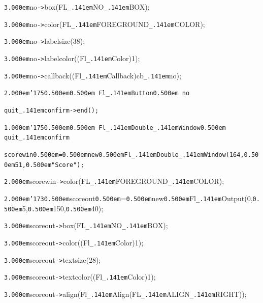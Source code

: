 \documentclass[12pt]{article}
\begin{document}
\noindent
{}{\tt\mc \kern3.000em}no{\tt -}{\tt >}box(FL{\tt\_\kern.141em}NO{\tt\_\kern.141em}BOX);

\noindent
{}{\tt\mc \kern3.000em}no{\tt -}{\tt >}color(FL{\tt\_\kern.141em}FOREGROUND{\tt\_\kern.141em}COLOR);

\noindent
{}{\tt\mc \kern3.000em}no{\tt -}{\tt >}labelsize(38);

\noindent
{}{\tt\mc \kern3.000em}no{\tt -}{\tt >}labelcolor((Fl{\tt\_\kern.141em}Color)1);

\noindent
{}{\tt\mc \kern3.000em}no{\tt -}{\tt >}callback((Fl{\tt\_\kern.141em}Callback{\tt *})cb{\tt\_\kern.141em}no);

\noindent
{}{\tt\mc \kern2.000em}{\tt\char'175}{\tt\mc \kern0.500em}\tt\mc {\tt /}{\tt /}\kern0.500em Fl{\tt\_\kern.141em}Button{\tt *}\kern0.500em no

\noindent
\tt\mc {\tt\mc \kern2.000em}quit{\tt\_\kern.141em}confirm{\tt -}{\tt >}end();

\noindent
{}{\tt\mc \kern1.000em}{\tt\char'175}{\tt\mc \kern0.500em}\tt\mc {\tt /}{\tt /}\kern0.500em Fl{\tt\_\kern.141em}Double{\tt\_\kern.141em}Window{\tt *}\kern0.500em quit{\tt\_\kern.141em}confirm

\noindent
\tt{}scorewin{\tt\mc \kern0.500em}={\tt\mc \kern0.500em}new{\tt\mc \kern0.500em}Fl{\tt\_\kern.141em}Double{\tt\_\kern.141em}Window(164,{\tt\mc \kern0.500em}51,{\tt\mc \kern0.500em}{\tt "}Score{\tt "});

\noindent
{}{\tt\mc \kern2.000em}scorewin{\tt -}{\tt >}color(FL{\tt\_\kern.141em}FOREGROUND{\tt\_\kern.141em}COLOR);

\noindent
{}{\tt\mc \kern2.000em}{\tt\char'173}{\tt\mc \kern0.500em}scoreout{\tt\mc \kern0.500em}={\tt\mc \kern0.500em}new{\tt\mc \kern0.500em}Fl{\tt\_\kern.141em}Output(0,{\tt\mc \kern0.500em}5,{\tt\mc \kern0.500em}150,{\tt\mc \kern0.500em}40);

\noindent
{}{\tt\mc \kern3.000em}scoreout{\tt -}{\tt >}box(FL{\tt\_\kern.141em}NO{\tt\_\kern.141em}BOX);

\noindent
{}{\tt\mc \kern3.000em}scoreout{\tt -}{\tt >}color((Fl{\tt\_\kern.141em}Color)1);

\noindent
{}{\tt\mc \kern3.000em}scoreout{\tt -}{\tt >}textsize(28);

\noindent
{}{\tt\mc \kern3.000em}scoreout{\tt -}{\tt >}textcolor((Fl{\tt\_\kern.141em}Color)1);

\noindent
{}{\tt\mc \kern3.000em}scoreout{\tt -}{\tt >}align(Fl{\tt\_\kern.141em}Align(FL{\tt\_\kern.141em}ALIGN{\tt\_\kern.141em}RIGHT));
\end{document}
